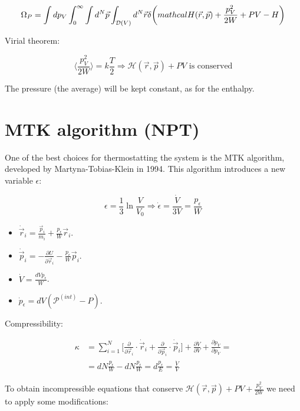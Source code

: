 	$$\Omega_P = \int dp_V\int_0^{\infty}\int d^N\vec{p}\int_{\mathcal{D}(V)}d^N\vec{r}\delta\biggl(\\mathcal{H}(\vec{r},\vec{p}) + \frac{p_V^2}{2W}+PV-H\biggr)$$

	Virial theorem:

	$$\biggl\langle\frac{p_V^2}{2W}\biggr\rangle = k\frac{T}{2}\Rightarrow \mathcal{H}(\vec{r},\vec{p}) + PV\text{ is conserved}$$
	
	The pressure (the average) will be kept constant, as for the enthalpy.

\section{MTK algorithm (NPT)}
One of the best choices for thermostatting the system is the MTK algorithm, developed by Martyna-Tobias-Klein in 1994. 
This algorithm introduces a new variable $\epsilon$:

$$\epsilon = \frac{1}{3}\ln\frac{V}{V_0}\Rightarrow\dot{\epsilon} = \frac{\dot{V}}{3V}=\frac{p_\epsilon}{W}$$

\begin{multicols}{2}
	\begin{itemize}
		\item $\dot{\vec{r}}_i = \frac{\vec{p}_i}{m_i} + \frac{p_\epsilon}{W}\vec{r}_i$.
		\item $\dot{\vec{p}}_i = -\frac{\partial U}{\partial\vec{r}_i} - \frac{p_\epsilon}{W}\vec{p}_i$.
		\item $\dot{V} = \frac{dVp_\epsilon}{W}$.
		\item $\dot{p}_\epsilon = dV(\mathcal{P}^{(int)}-P)$.
	\end{itemize}
\end{multicols}


Compressibility:

\begin{align*}
	\kappa & = \sum\limits_{i=1}^N\biggl[\frac{\partial}{\partial\vec{r}_i}\cdot\dot{\vec{r}}_i + \frac{\partial}{\partial\vec{p}_i}\cdot\dot{\vec{p}}_i\biggr] + \frac{\partial\dot{V}}{\partial V} + \frac{\partial\dot{p}_V}{\partial p_V} = \\
				 &= dN\frac{p_\epsilon}{W}-dN\frac{p_\epsilon}{W} = d\frac{p_\epsilon}{E} = \frac{\dot{V}}{V}
\end{align*}

To obtain incompressible equations that conserve $\mathcal{H}(\vec{r},\vec{p}) + PV + \frac{p_V^2}{2W}$ we need to apply some modifications:

